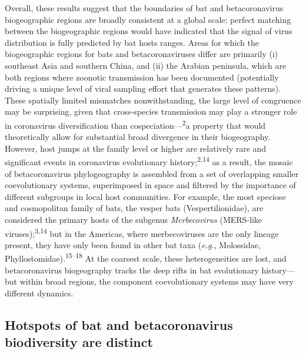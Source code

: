 \documentclass[10pt,oneside]{article}
\begin{document}
Overall, these results suggest that the boundaries of bat and
betacoronavirus biogeographic regions are broadly consistent at a global
scale; perfect matching between the biogeographic regions would have
indicated that the signal of virus distribution is fully predicted by
bat hosts ranges. Areas for which the biogeographic regions for bats and
betacoronaviruses differ are primarily (i) southeast Asia and southern
China, and (ii) the Arabian peninsula, which are both regions where
zoonotic transmission has been documented (potentially driving a unique
level of viral sampling effort that generates these patterns). These
spatially limited mismatches nonwithstanding, the large level of
congruence may be surprising, given that cross-species transmission may
play a stronger role in coronavirus diversification than
cospeciation---\textsuperscript{2}a property that would theoretically
allow for substantial broad divergence in their biogeography. However,
host jumps at the family level or higher are relatively rare and
significant events in coronavirus evolutionary
history;\textsuperscript{2,14} as a result, the mosaic of
betacoronavirus phylogeography is assembled from a set of overlapping
smaller coevolutionary systems, superimposed in space and filtered by
the importance of different subgroups in local host communities. For
example, the most speciose and cosmopolitan family of bats, the vesper
bats (Vespertilionidae), are considered the primary hosts of the
subgenus \emph{Merbecovirus} (MERS-like viruses);\textsuperscript{3,14}
but in the Americas, where merbecoviruses are the only lineage present,
they have only been found in other bat taxa (\emph{e.g.}, Molossidae,
Phyllostomidae).\textsuperscript{15--18} At the coarsest scale, these
heterogeneities are lost, and betacoronavirus biogeography tracks the
deep rifts in bat evolutionary history---but within broad regions, the
component coevolutionary systems may have very different dynamics.

\hypertarget{hotspots-of-bat-and-betacoronavirus-biodiversity-are-distinct}{%
\subsection{Hotspots of bat and betacoronavirus biodiversity are
distinct}\label{hotspots-of-bat-and-betacoronavirus-biodiversity-are-distinct}}
\end{document}
